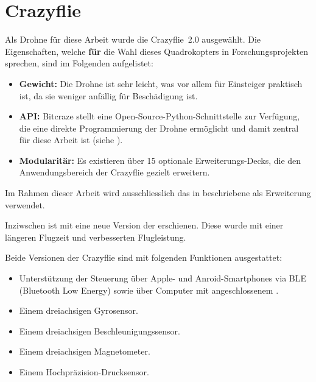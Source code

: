 \section{Crazyflie}
\label{sec:cf}

Als Drohne für diese Arbeit wurde die Crazyflie~2.0 ausgewählt.
Die Eigenschaften, welche \textbf{für} die Wahl dieses Quadrokopters in Forschungsprojekten sprechen, sind im Folgenden aufgelistet:

\begin{itemize}
    \item \textbf{Gewicht:} Die Drohne ist sehr leicht, was vor allem für Einsteiger praktisch ist, da sie weniger anfällig für Beschädigung ist.
    \item \textbf{API:} Bitcraze stellt eine Open-Source-Python-Schnittstelle zur Verfügung, die eine direkte Programmierung der Drohne ermöglicht und damit zentral für diese Arbeit ist (siehe ).
    \item \textbf{Modularitär:} Es existieren über 15 optionale Erweiterungs-Decks, die den Anwendungsbereich der Crazyflie gezielt erweitern.
\end{itemize}

Im Rahmen dieser Arbeit wird ausschliesslich das in  beschriebene  als Erweiterung verwendet.

Inziwschen ist mit  eine neue Version der erschienen.
Diese wurde mit einer längeren Flugzeit und verbesserten Flugleistung. 

Beide Versionen der Crazyflie sind mit folgenden Funktionen ausgestattet:

\begin{itemize}
    \item Unterstützung der Steuerung über Apple- und Anroid-Smartphones via BLE (Bluetooth Low Energy) sowie über Computer mit angeschlossenem .
    \item Einem dreiachsigen Gyrosensor.\footnotemark
    \item Einem dreiachsigen Beschleunigungssensor.\footnotemark[\value{footnote}]
    \item Einem dreiachsigen Magnetometer.\footnotemark[\value{footnote}]
    \item Einem Hochpräzision-Drucksensor.
\end{itemize}


